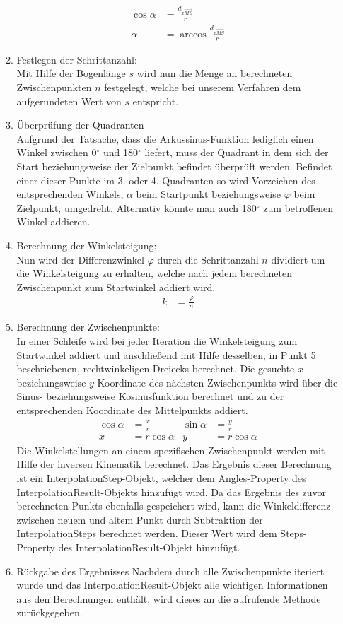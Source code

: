 \begin{itemize}
\begin{enumerate}
\begin{align*}
\cos \alpha & = \frac{d_{x\overrightarrow{MS}}}{r}\\
\alpha & = \arccos \frac{d_{x\overrightarrow{MS}}}{r}
\end{align*}
\item Festlegen der Schrittanzahl:\\
Mit Hilfe der Bogenlänge $s$ wird nun die Menge an berechneten Zwischenpunkten $n$ festgelegt, welche bei unserem Verfahren dem aufgerundeten Wert von  $s$ entspricht.
\item Überprüfung der Quadranten\\
Aufgrund der Tatsache, dass die Arkussinus-Funktion lediglich einen Winkel zwischen 0$^\circ$ und 180$^\circ$ liefert, muss der Quadrant in dem sich der Start beziehungsweise der Zielpunkt befindet überprüft werden. Befindet einer dieser Punkte  im 3. oder 4. Quadranten so wird Vorzeichen des entsprechenden Winkels, $\alpha$ beim Startpunkt beziehungsweise $\varphi$ beim Zielpunkt, umgedreht. Alternativ könnte man auch 180$^\circ$ zum betroffenen Winkel addieren.
\item Berechnung der Winkelsteigung:\\
Nun wird der Differenzwinkel $\varphi$ durch die Schrittanzahl $n$ dividiert um die Winkelsteigung zu erhalten, welche nach jedem berechneten Zwischenpunkt zum Startwinkel addiert wird.
\begin{align*}
k & = \frac{\varphi}{n}
\end{align*}
\item Berechnung der Zwischenpunkte:\\
In einer Schleife wird bei jeder Iteration die Winkelsteigung zum Startwinkel addiert und anschließend mit Hilfe desselben, in Punkt 5 beschriebenen, rechtwinkeligen Dreiecks berechnet. Die gesuchte $x$ beziehungsweise $y$-Koordinate des nächsten Zwischenpunkts wird über die Sinus- beziehungsweise Kosinusfunktion berechnet und zu der entsprechenden Koordinate des Mittelpunkts addiert.
\begin{align*}
\cos \alpha & = \frac{x}{r} & \sin \alpha & = \frac{y}{r}\\
x & = r \cos \alpha & y & = r \cos \alpha
\end{align*}
Die Winkelstellungen an einem spezifischen Zwischenpunkt werden mit Hilfe der inversen Kinematik berechnet. Das Ergebnis dieser Berechnung ist ein InterpolationStep-Objekt, welcher dem Angles-Property des InterpolationResult-Objekts hinzufügt wird. Da das Ergebnis des zuvor berechneten Punkts ebenfalls gespeichert wird, kann die Winkeldifferenz zwischen neuem und altem Punkt durch Subtraktion der InterpolationSteps berechnet werden. Dieser Wert wird dem Steps-Property des InterpolationResult-Objekt hinzufügt.
\item Rückgabe des Ergebnisses
Nachdem durch alle Zwischenpunkte iteriert wurde und das InterpolationResult-Objekt alle wichtigen Informationen aus den Berechnungen enthält, wird dieses an die aufrufende Methode zurückgegeben.
\end{enumerate}
\end{itemize}